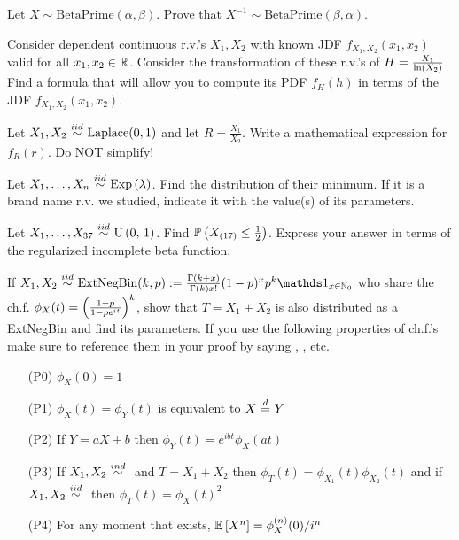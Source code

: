 \documentclass[12pt]{article}
\begin{document}
 Let $X \sim \text{BetaPrime}(\alpha, \beta)$. Prove that $X^{-1} \sim \text{BetaPrime}(\beta, \alpha)$. 




 Consider dependent continuous r.v.'s $X_1, X_2$ with known JDF $f_{X_1, X_2}(x_1, x_2)$ valid for all $x_1, x_2 \in \mathbb{R}$. Consider the transformation of these r.v.'s of $H = \frac{X_1}{\ln\left(X_2\right)}$. Find a formula that will allow you to compute its PDF $f_H(h)$ in terms of the JDF $f_{X_1, X_2}(x_1, x_2)$. 


 Let $X_1, X_2 \iid \text{Laplace}(0,1)$ and let $R = \frac{X_1}{X_2}$. Write a mathematical expression for $f_R(r)$. Do NOT simplify! 



 Let $\Xoneton \iid \exponential{\lambda}$. Find the distribution of their minimum. If it is a brand name r.v. we studied, indicate it with the value(s) of its parameters. 

 Let $X_1, \ldots, X_{37} \iid \stduniform$. Find $\mathbb{P}\left(X_{(17)} \leq \frac{1}{2}\right)$. Express your answer in terms of the regularized incomplete beta function. 

 If $X_1, X_2 \iid \text{ExtNegBin}(k, p) := \frac{\Gamma(k + x)}{\Gamma(k)x!} (1 - p)^x p^k \indic{x \in \naturals_0}$ who share the ch.f. $\phi_X(t) = \left(\frac{1-p}{1-pe^{it}}\right)^{k}$, show that $T = X_1 + X_2$ is also distributed as a ExtNegBin and find its parameters. If you use the following properties of ch.f.'s make sure to reference them in your proof by saying , , etc.

\footnotesize
\begin{itemize}
\item[(P0)] $\phi_X(0) = 1$
\item[(P1)] $\phi_X(t) = \phi_Y(t)$ is equivalent to $X \equalsindist Y$
\item[(P2)] If $Y = aX + b$ then $\phi_Y(t) = e^{ibt}\phi_X(at)$
\item[(P3)] If $X_1, X_2 \inddist$ and $T = X_1 + X_2$ then $\phi_T(t) = \phi_{X_1}(t) \phi_{X_2}(t)$ and if $X_1, X_2 \iid$ then $\phi_T(t) = \phi_{X}(t)^2$
\item[(P4)] For any moment that exists, $\mathbb{E}\left[X^n\right] = \phi^{(n)}_X(0) / i^n$
\end{itemize}
\normalsize~
\end{document}
